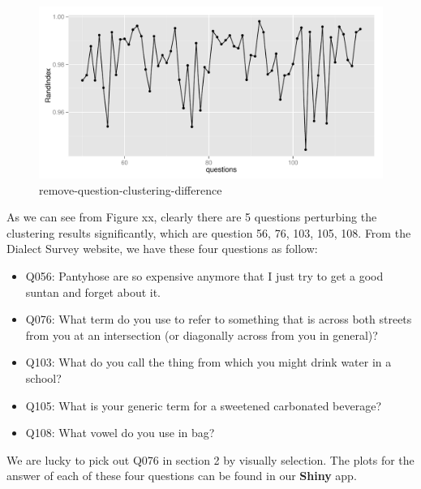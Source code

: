 \begin{figure}
\centering
\includegraphics[width=0.9\linewidth]{fig/remove-question-clustering-difference.pdf}
\caption{remove-question-clustering-difference} \label{fig:removeQuestion}
\end{figure}

\noindent As we can see from Figure xx, clearly there are 5 questions
perturbing the clustering results significantly, which are question
56, 76, 103, 105, 108. From the Dialect Survey website, we have these
four questions as follow:

\begin{itemize}

\item Q056: Pantyhose are so expensive anymore that I just try to get
a good suntan and forget about it.

\item Q076: What term do you use to refer to something that is across
both streets from you at an intersection (or diagonally across from
you in general)?

\item Q103: What do you call the thing from which you might drink
water in a school?

\item Q105: What is your generic term for a sweetened carbonated
beverage?

\item Q108: What vowel do you use in bag?


\end{itemize}

\noindent We are lucky to pick out Q076 in section 2 by visually
selection. The plots for the answer of each of these four questions
can be found in our \textbf{Shiny} app.
